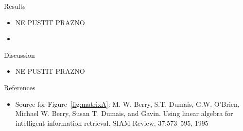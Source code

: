 \documentclass{beamer}
\begin{document}
\begin{frame}{Results}
    \begin{itemize}
        \item NE PUSTIT PRAZNO
        \item 
    \end{itemize}
\end{frame}

\begin{frame}{Discussion}
    \begin{itemize}
        \item NE PUSTIT PRAZNO
    \end{itemize}
\end{frame}

\begin{frame}{References}
    \begin{itemize}
        \item Source for Figure~\ref{fig:matrixA}: M. W. Berry, S.T. Dumais, G.W. O’Brien, Michael W. Berry, Susan T.
        Dumais, and Gavin. Using linear algebra for intelligent information retrieval.
        SIAM Review, 37:573–595, 1995
    \end{itemize}
\end{frame}
\end{document}
